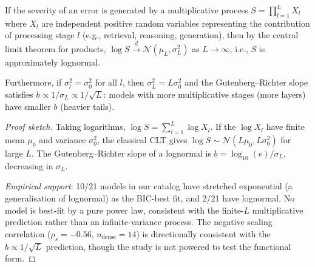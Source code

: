 \begin{proposition}
\label{prop:multiplicative}
If the severity of an error is generated by a multiplicative process
$S = \prod_{l=1}^{L} X_l$ where $X_l$ are independent positive random
variables representing the contribution of processing stage $l$
(e.g., retrieval, reasoning, generation), then by the central limit
theorem for products, $\log S \xrightarrow{d} \mathcal{N}(\mu_L, \sigma_L^2)$
as $L \to \infty$, i.e., $S$ is approximately lognormal.

Furthermore, if $\sigma_l^2 = \sigma_0^2$ for all $l$, then
$\sigma_L^2 = L \sigma_0^2$ and the Gutenberg--Richter slope satisfies
$b \propto 1 / \sigma_L \propto 1 / \sqrt{L}$: models with more
multiplicative stages (more layers) have smaller $b$ (heavier tails).
\end{proposition}

\begin{proof}[Proof sketch]
Taking logarithms, $\log S = \sum_{l=1}^{L} \log X_l$. If the
$\log X_l$ have finite mean $\mu_0$ and variance $\sigma_0^2$, the
classical CLT gives $\log S \sim \mathcal{N}(L\mu_0, L\sigma_0^2)$
for large $L$. The Gutenberg--Richter slope of a lognormal is
$b = \log_{10}(e) / \sigma_L$, decreasing in $\sigma_L$.

\emph{Empirical support}: 10/21 models in our catalog have stretched
exponential (a generalisation of lognormal) as the BIC-best fit, and
2/21 have lognormal. No model is best-fit by a pure power law, consistent
with the finite-$L$ multiplicative prediction rather than an
infinite-variance process. The negative scaling correlation
($\rho_s = -0.56$, $n_{\text{dense}} = 14$) is directionally consistent
with the $b \propto 1/\sqrt{L}$ prediction, though the study is not
powered to test the functional form.
\end{proof}
